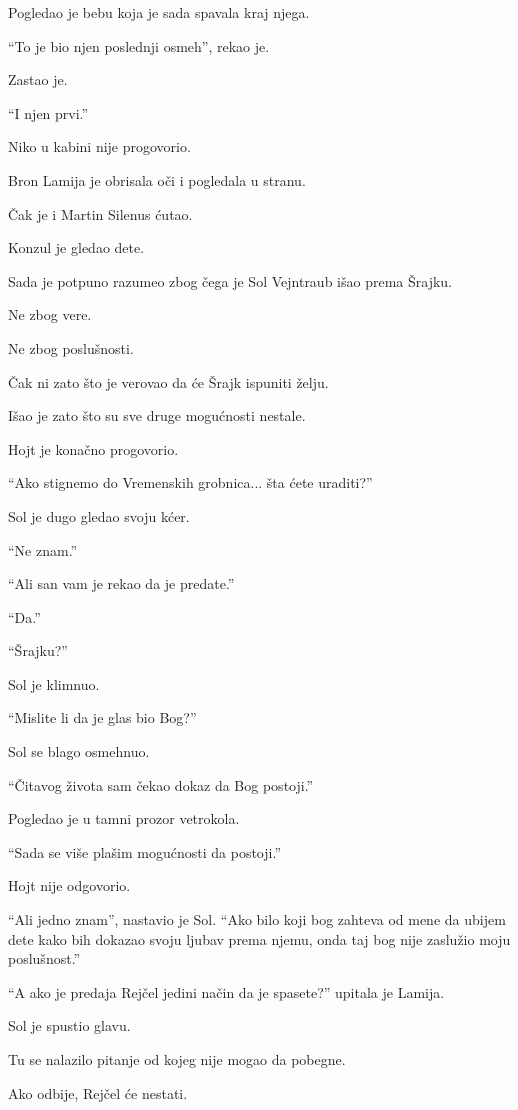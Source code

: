 Pogledao je bebu koja je sada spavala kraj njega.

``To je bio njen poslednji osmeh'', rekao je.

Zastao je.

``I njen prvi.''

\bigskip

Niko u kabini nije progovorio.

Bron Lamija je obrisala oči i pogledala u stranu.

Čak je i Martin Silenus ćutao.

Konzul je gledao dete.

Sada je potpuno razumeo zbog čega je Sol Vejntraub išao prema Šrajku.

Ne zbog vere.

Ne zbog poslušnosti.

Čak ni zato što je verovao da će Šrajk ispuniti želju.

Išao je zato što su sve druge mogućnosti nestale.

Hojt je konačno progovorio.

``Ako stignemo do Vremenskih grobnica... šta ćete uraditi?''

Sol je dugo gledao svoju kćer.

``Ne znam.''

``Ali san vam je rekao da je predate.''

``Da.''

``Šrajku?''

Sol je klimnuo.

``Mislite li da je glas bio Bog?''

Sol se blago osmehnuo.

``Čitavog života sam čekao dokaz da Bog postoji.''

Pogledao je u tamni prozor vetrokola.

``Sada se više plašim mogućnosti da postoji.''

Hojt nije odgovorio.

``Ali jedno znam'', nastavio je Sol. ``Ako bilo koji bog zahteva od mene da ubijem dete kako bih dokazao svoju ljubav prema njemu, onda taj bog nije zaslužio moju poslušnost.''

``A ako je predaja Rejčel jedini način da je spasete?'' upitala je Lamija.

Sol je spustio glavu.

Tu se nalazilo pitanje od kojeg nije mogao da pobegne.

Ako odbije, Rejčel će nestati.

